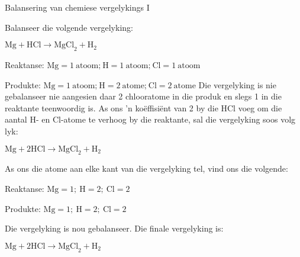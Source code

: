 \begin{wex}{Balansering van chemiese vergelykings I}{Balanseer die volgende vergelyking:
\begin{center}
${\text{Mg} + \text{HCl} \rightarrow \text{MgCl}_{2} + \text{H}_{2}}$\\
\end{center}
}
{

Reaktanse: $\text{Mg} = 1 ~\text{atoom;}~ \text{H} = 1 ~\text{atoom;}~ \text{Cl} = 1 ~\text{atoom}$

Produkte: $\text{Mg} = 1 ~\text{atoom;}~ \text{H} = 2 ~\text{atome;}~ \text{Cl} = 2 ~\text{atome}$
Die vergelyking is nie gebalanseer nie aangesien daar 2 chlooratome in die produk en slegs 1 in die reaktante teenwoordig is. As ons 'n koëffisiënt van 2 by die HCl voeg om die aantal H- en Cl-atome te verhoog by die reaktante, sal die vergelyking soos volg lyk:
\begin{center}
${\text{Mg} + 2\text{HCl} \rightarrow \text{MgCl}_{2} + \text{H}_{2}}$\\
\end{center}


As ons die atome aan elke kant van die vergelyking tel, vind ons die volgende:

Reaktanse: $\text{Mg} = 1;~ \text{H} = 2;~ \text{Cl} = 2$

Produkte: $\text{Mg} = 1;~ \text{H} = 2;~ \text{Cl} = 2$

Die vergelyking is nou gebalanseer. Die finale vergelyking is:
\begin{center}
${\text{Mg} + 2\text{HCl} \rightarrow \text{MgCl}_{2} + \text{H}_{2}}$
\end{center}
}
\end{wex}
    \noindent
\par
            \label{m38726*secfhsst!!!underscore!!!id394}
      \noindent
